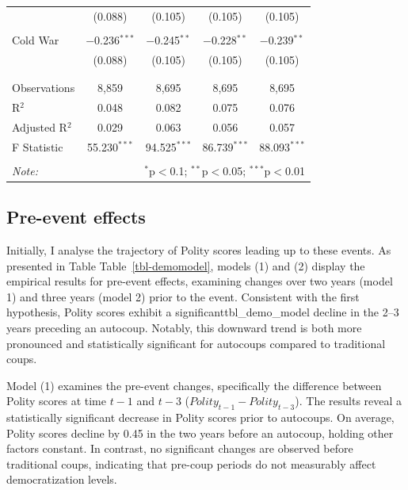 \documentclass[
  12pt,
]{report}
\begin{document}
\begin{table}
{\begin{tabular}{@{\extracolsep{30pt}}lcccc}
  & (0.088) & (0.105) & (0.105) & (0.105) \\ 
  & & & & \\ 
 Cold War & $-$0.236$^{***}$ & $-$0.245$^{**}$ & $-$0.228$^{**}$ & $-$0.239$^{**}$ \\ 
  & (0.088) & (0.105) & (0.105) & (0.105) \\ 
  & & & & \\ 
\hline \\[-1.8ex] 
Observations & 8,859 & 8,695 & 8,695 & 8,695 \\ 
R$^{2}$ & 0.048 & 0.082 & 0.075 & 0.076 \\ 
Adjusted R$^{2}$ & 0.029 & 0.063 & 0.056 & 0.057 \\ 
F Statistic & 55.230$^{***}$ & 94.525$^{***}$ & 86.739$^{***}$ & 88.093$^{***}$ \\ 
\hline 
\hline \\[-1.8ex] 
\textit{Note:}  & \multicolumn{4}{r}{$^{*}$p$<$0.1; $^{**}$p$<$0.05; $^{***}$p$<$0.01} \\ 
\end{tabular}

}

\end{table}%

\subsection{Pre-event effects}\label{pre-event-effects}

Initially, I analyse the trajectory of Polity scores leading up to these
events. As presented in Table Table~\ref{tbl-demomodel}, models (1) and
(2) display the empirical results for pre-event effects, examining
changes over two years (model 1) and three years (model 2) prior to the
event. Consistent with the first hypothesis, Polity scores exhibit a
significanttbl\_demo\_model decline in the 2--3 years preceding an
autocoup. Notably, this downward trend is both more pronounced and
statistically significant for autocoups compared to traditional coups.

Model (1) examines the pre-event changes, specifically the difference
between Polity scores at time \(t-1\) and \(t-3\)
(\(Polity_{t-1} - Polity_{t-3}\)). The results reveal a statistically
significant decrease in Polity scores prior to autocoups. On average,
Polity scores decline by 0.45 in the two years before an autocoup,
holding other factors constant. In contrast, no significant changes are
observed before traditional coups, indicating that pre-coup periods do
not measurably affect democratization levels.
\end{document}

